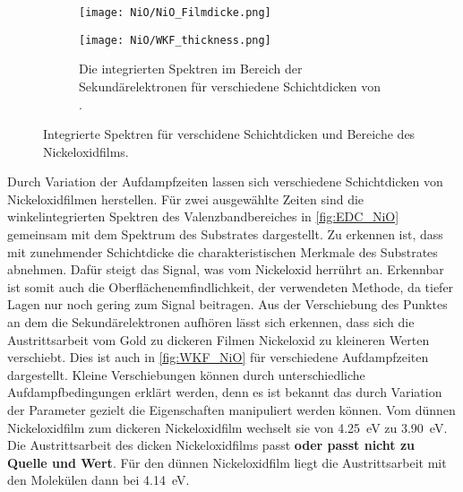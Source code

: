         \begin{figure}
            \centering
            \begin{subfigure}[t]{0.48\textwidth}
                \centering
                \texttt{[image: NiO/NiO\_Filmdicke.png]}
                \label{fig:EDC_NiO}
            \end{subfigure}
            \begin{subfigure}[t]{0.48\textwidth}
                \centering
                \texttt{[image: NiO/WKF\_thickness.png]}
                \caption{Die integrierten Spektren im Bereich der Sekundärelektronen für verschiedene Schichtdicken von .}
                \label{fig:WKF_NiO}
            \end{subfigure}
            \caption{Integrierte Spektren für verschidene Schichtdicken und Bereiche des Nickeloxidfilms.}
        \end{figure}
        Durch Variation der Aufdampfzeiten lassen sich verschiedene Schichtdicken von Nickeloxidfilmen herstellen.
        Für zwei ausgewählte Zeiten sind die winkelintegrierten Spektren des Valenzbandbereiches in \autoref{fig:EDC_NiO} gemeinsam mit dem Spektrum des Substrates dargestellt.
        Zu erkennen ist, dass mit zunehmender Schichtdicke die charakteristischen Merkmale des Substrates abnehmen.
        Dafür steigt das Signal, was vom Nickeloxid herrührt an.
        Erkennbar ist somit auch die Oberflächenemfindlichkeit, der verwendeten Methode, da tiefer Lagen nur noch gering zum Signal beitragen.
        Aus der Verschiebung des Punktes an dem die Sekundärelektronen aufhören lässt sich erkennen, dass sich die Austrittsarbeit vom Gold zu dickeren Filmen Nickeloxid zu kleineren Werten verschiebt.
        Dies ist auch in \autoref{fig:WKF_NiO} für verschiedene Aufdampfzeiten dargestellt. 
        Kleine Verschiebungen können durch unterschiedliche Aufdampfbedingungen erklärt werden, denn es ist bekannt das durch Variation der Parameter gezielt die Eigenschaften manipuliert werden können.
        Vom dünnen Nickeloxidfilm zum dickeren Nickeloxidfilm wechselt sie von \SI{4.25}{\electronvolt} zu \SI{3.90}{\electronvolt}.
        Die Austrittsarbeit des dicken Nickeloxidfilms passt \textbf{oder passt nicht zu Quelle und Wert}.
        Für den dünnen Nickeloxidfilm liegt die Austrittsarbeit mit den Molekülen dann bei \SI{4.14}{\electronvolt}.

